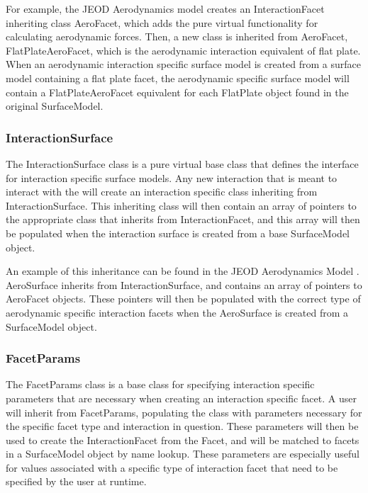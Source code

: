 For example, the JEOD Aerodynamics model
\cite{dynenv:AERODYNAMICS} creates an InteractionFacet inheriting class
AeroFacet, which adds the pure virtual functionality for calculating
aerodynamic forces. Then, a new class is inherited from AeroFacet,
FlatPlateAeroFacet, which is the aerodynamic interaction equivalent
of flat plate. When an aerodynamic interaction specific surface model
is created from a surface model containing a flat plate facet, the
aerodynamic specific surface model will contain a FlatPlateAeroFacet
equivalent for each FlatPlate object found in the original SurfaceModel.

\subsubsection{InteractionSurface}

The InteractionSurface class is a pure virtual base class that defines
the interface for interaction specific surface models. 
Any new interaction that is meant to interact with the \ModelDesc will
create an interaction specific class inheriting from InteractionSurface.
This inheriting class will then contain an
array of pointers to the appropriate class that inherits from
InteractionFacet, and this array will then be populated when
the interaction surface is created from a base SurfaceModel
object.

An example of this inheritance can be found in the JEOD Aerodynamics
Model \cite{dynenv:AERODYNAMICS}. AeroSurface inherits from
InteractionSurface, and contains an array of pointers to
AeroFacet objects. These pointers will then be populated with
the correct type of aerodynamic specific interaction facets when
the AeroSurface is created from a SurfaceModel object.

\subsubsection{FacetParams}

The FacetParams class is a base class for specifying interaction
specific parameters that are necessary when creating an interaction specific
facet. A user will inherit from FacetParams, populating the
class with parameters necessary for the specific facet type and interaction
in question. These parameters will then be used to create the
InteractionFacet from the Facet, and will be matched to facets in 
a SurfaceModel object by name lookup. These parameters are especially
useful for values associated with a specific type of interaction facet
that need to be specified by the user at runtime.

